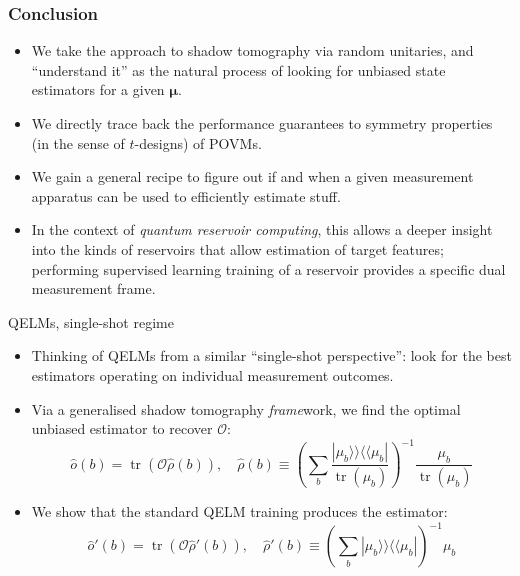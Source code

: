 \documentclass{beamer}
\begin{document}
\begin{frame}
  \frametitle{Conclusion}
  \begin{itemize}\setlength\itemsep{0.5em}
      \item We take the approach to shadow tomography via random unitaries, and ``understand it'' as the natural process of looking for unbiased state estimators for a given $\boldsymbol\mu$.
      \item We directly trace back the performance guarantees to symmetry properties (in the sense of $t$-designs) of POVMs.
      \item We gain a general recipe to figure out if and when a given measurement apparatus can be used to efficiently estimate stuff.
      \item In the context of \textit{quantum reservoir computing}, this allows a deeper insight into the kinds of reservoirs that allow estimation of target features; performing supervised learning training of a reservoir provides a specific dual measurement frame.
  \end{itemize}
\end{frame}


\begin{frame}{QELMs, single-shot regime}

\begin{itemize}
    \item Thinking of QELMs from a similar ``single-shot perspective'': look for the best estimators operating on individual measurement outcomes.
    \item Via a generalised shadow tomography \textit{frame}work, we find the optimal unbiased estimator to recover $\mathcal O$:
    \begin{equation}
        \hat o(b) = \operatorname{tr}(\mathcal O \hat\rho(b)),
        \quad
        \hat\rho(b)\equiv  \left(\sum_b \frac{|\mu_b\rangle\!\rangle\!\langle\!\langle \mu_b|}{\operatorname{tr}(\mu_b)} \right)^{-1}
        \frac{\mu_b}{\operatorname{tr}(\mu_b)}
    \end{equation}
    \item We show that the standard QELM training produces the estimator:
    \begin{equation}
        \hat o'(b) = \operatorname{tr}(\mathcal O\hat\rho'(b)),
        \quad \hat\rho'(b) \equiv
        \left(\sum_b|\mu_b\rangle\!\rangle\!\langle\!\langle\mu_b|\right)^{-1}\mu_b
    \end{equation}
\end{itemize}
\end{frame}
\end{document}
